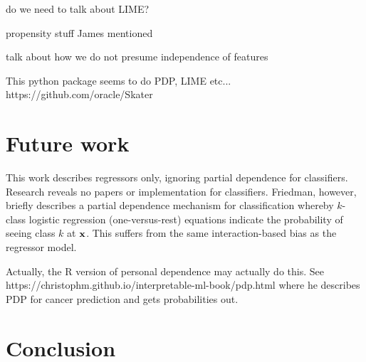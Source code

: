 \documentclass[12pt]{article}
\begin{document}
do we need to talk about LIME?

propensity stuff James mentioned

talk about how we do not presume independence of features
 
This python package seems to do PDP, LIME etc... https://github.com/oracle/Skater

\section{Future work}

This work describes regressors only, ignoring partial dependence for classifiers.  Research reveals no papers or implementation for classifiers. Friedman, however, briefly describes a partial dependence mechanism for classification whereby $k$-class logistic regression (one-versus-rest) equations indicate the probability of seeing class $k$ at $\bf{x}$.  This suffers from the same interaction-based bias as the regressor model.

Actually, the R version of personal dependence may actually do this. See https://christophm.github.io/interpretable-ml-book/pdp.html where he describes PDP for cancer prediction and gets probabilities out.

\section{Conclusion}
\label{sec:conc}




\end{document}
